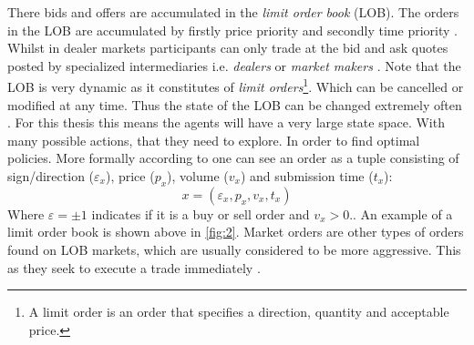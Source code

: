 \documentclass{kththesis}
\theoremstyle{definition}
\begin{document}
There bids and offers are accumulated in the \textit{limit order book} (LOB). The orders in the LOB are accumulated by firstly price priority and secondly time priority \parencite{hasbrouck2007empirical}. Whilst in dealer markets participants can only trade at the bid and ask quotes posted by specialized intermediaries i.e. \textit{dealers} or \textit{market makers} \parencite{foucault2013market}. Note that the LOB is very dynamic as it constitutes of \textit{limit orders}\footnote{A limit order is an order that specifies a direction, quantity and acceptable price.}. Which can be cancelled or modified at any time. Thus the state of the LOB can be changed extremely often \parencite{hasbrouck2007empirical}. For this thesis this means the agents will have a very large state space. With many possible actions, that they need to explore. In order to find optimal policies.
\newline
\newline
More formally according to \textcite{bouchaud2018trades} one can see an order as a tuple consisting of sign/direction ($\varepsilon_{x}$), price ($p_{x}$), volume ($v_{x}$) and submission time ($t_{x}$):
\begin{equation}
    \label{eq:0}
    x = (\varepsilon_{x}, p_{x}, v_{x}, t_{x})
\end{equation} Where $\varepsilon = \pm 1$ indicates if it is a buy or sell order and $v_{x} > 0$.. An example of a limit order book is shown above in \autoref{fig:2}. Market orders are other types of orders found on LOB markets, which are usually considered to be more aggressive. This as they seek to execute a trade immediately \parencite{cartea2015algorithmic}. 
\end{document}
